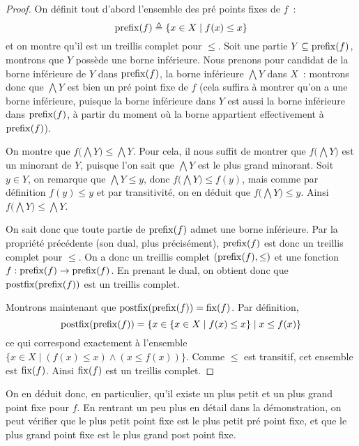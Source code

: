 \begin{proof}
  On définit tout d'abord l'ensemble des pré points fixes de $f$~:
  \[\operatorname{prefix}(f) \triangleq \{x\in X\mid f(x)\leq x\}\]
  et on montre qu'il est un treillis complet pour $\leq$. Soit une partie
  $Y\subseteq\operatorname{prefix}(f)$, montrons que $Y$ possède une borne inférieure. Nous
  prenons pour candidat de la borne inférieure de $Y$ dans $\operatorname{prefix}(f)$, la
  borne inférieure $\bigwedge Y$ dans $X$~: montrons donc que $\bigwedge Y$ est
  bien un pré point fixe de $f$ (cela suffira à montrer qu'on a une borne
  inférieure, puisque la borne inférieure dans $Y$ est aussi la borne inférieure
  dans $\operatorname{prefix}(f)$, à partir du moment où la borne appartient effectivement à
  $\operatorname{prefix}(f)$).

  On montre que $f\big(\bigwedge Y\big) \leq \bigwedge Y$. Pour cela, il nous
  suffit de montrer que $f\big(\bigwedge Y\big)$ est un minorant de $Y$, puisque
  l'on sait que $\bigwedge Y$ est le plus grand minorant. Soit $y\in Y$, on
  remarque que $\bigwedge Y \leq y$, donc $f\big(\bigwedge Y\big) \leq f(y)$,
  mais comme par définition $f(y)\leq y$ et par transitivité, on en déduit que
  $f\big(\bigwedge Y\big) \leq y$. Ainsi
  $f\big(\bigwedge Y\big) \leq \bigwedge Y$.

  On sait donc que toute partie de $\operatorname{prefix}(f)$ admet une borne inférieure. Par
  la propriété précédente (son dual, plus précisément), $\operatorname{prefix}(f)$ est donc
  un treillis complet pour $\leq$. On a donc un treillis complet
  $(\operatorname{prefix}(f),\leq)$ et une fonction $f : \operatorname{prefix}(f) \to\operatorname{prefix}(f)$. En prenant
  le dual, on obtient donc que $\operatorname{postfix}(\operatorname{prefix}(f))$ est un treillis complet.

  Montrons maintenant que $\operatorname{postfix}(\operatorname{prefix}(f)) = \operatorname{fix}(f)$. Par définition,
  \[\operatorname{postfix}(\operatorname{prefix}(f)) =
  \{x\in \{x\in X \mid f(x)\leq x\} \mid x \leq f(x)\}\]
  ce qui correspond exactement à l'ensemble
  $\{x\in X\mid (f(x) \leq x) \land (x \leq f(x))\}$. Comme $\leq$ est
  transitif, cet ensemble est $\operatorname{fix}(f)$. Ainsi $\operatorname{fix}(f)$ est un treillis
  complet.
\end{proof}

\begin{remark}
  On en déduit donc, en particulier, qu'il existe un plus petit et un plus grand
  point fixe pour $f$. En rentrant un peu plus en détail dans la démonstration,
  on peut vérifier que le plus petit point fixe est le plus petit pré point
  fixe, et que le plus grand point fixe est le plus grand post point fixe.
\end{remark}

